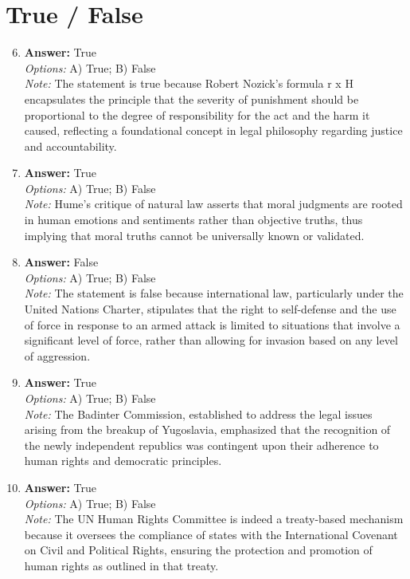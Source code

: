 \documentclass[12pt]{article}
\begin{document}
\section*{True / False}
\begin{enumerate}[label=\arabic*.]
\setcounter{enumi}{5}
\item \textbf{Answer:} True
\\ \textit{Options:} A) True; B) False
\\ \textit{Note:} The statement is true because Robert Nozick's formula r x H encapsulates the principle that the severity of punishment should be proportional to the degree of responsibility for the act and the harm it caused, reflecting a foundational concept in legal philosophy regarding justice and accountability.
\item \textbf{Answer:} True
\\ \textit{Options:} A) True; B) False
\\ \textit{Note:} Hume's critique of natural law asserts that moral judgments are rooted in human emotions and sentiments rather than objective truths, thus implying that moral truths cannot be universally known or validated.
\item \textbf{Answer:} False
\\ \textit{Options:} A) True; B) False
\\ \textit{Note:} The statement is false because international law, particularly under the United Nations Charter, stipulates that the right to self-defense and the use of force in response to an armed attack is limited to situations that involve a significant level of force, rather than allowing for invasion based on any level of aggression.
\item \textbf{Answer:} True
\\ \textit{Options:} A) True; B) False
\\ \textit{Note:} The Badinter Commission, established to address the legal issues arising from the breakup of Yugoslavia, emphasized that the recognition of the newly independent republics was contingent upon their adherence to human rights and democratic principles.
\item \textbf{Answer:} True
\\ \textit{Options:} A) True; B) False
\\ \textit{Note:} The UN Human Rights Committee is indeed a treaty-based mechanism because it oversees the compliance of states with the International Covenant on Civil and Political Rights, ensuring the protection and promotion of human rights as outlined in that treaty.
\end{enumerate}
\end{document}
